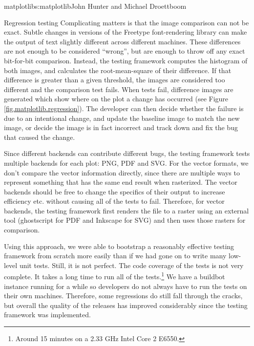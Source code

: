 \begin{aosachapter}{matplotlib}{s:matplotlib}{John Hunter and Michael Droettboom}
\begin{aosasect1}{Regression testing}
Complicating matters is that the image comparison can not be exact.
Subtle changes in versions of the Freetype font-rendering library can
make the output of text slightly different across different machines.
These differences are not enough to be considered ``wrong'', but are
enough to throw off any exact bit-for-bit comparison.  Instead, the
testing framework computes the histogram of both images, and
calculates the root-mean-square of their difference.  If that
difference is greater than a given threshold, the images are
considered too different and the comparison test fails.  When tests
fail, difference images are generated which show where on the plot a
change has occurred (see Figure \ref{fig.matplotlib.regression}).  The
developer can then decide whether the failure is due to an intentional
change, and update the baseline image to match the new image, or
decide the image is in fact incorrect and track down and fix the bug
that caused the change.


Since different backends can contribute different bugs, the testing
framework tests multiple backends for each plot: PNG, PDF and SVG.
For the vector formats, we don't compare the vector information
directly, since there are multiple ways to represent something that
has the same end result when rasterized.  The vector backends should
be free to change the specifics of their output to increase efficiency
etc. without causing all of the tests to fail.  Therefore, for vector
backends, the testing framework first renders the file to a raster
using an external tool (ghostscript for PDF and Inkscape for SVG) and
then uses those rasters for comparison.

Using this approach, we were able to bootstrap a reasonably effective
testing framework from scratch more easily than if we had gone on to
write many low-level unit tests.  Still, it is not perfect.  The code
coverage of the tests is not very complete.  It takes a long time to
run all of the tests.\footnote{Around 15 minutes on a 2.33 GHz Intel
  Core 2 E6550.}  We have a buildbot instance running for a while
so developers do not always have to run the tests on their own
machines.  Therefore, some regressions do still fall through the
cracks, but overall the quality of the releases has improved
considerably since the testing framework was implemented.


\end{aosasect1}
\end{aosachapter}
